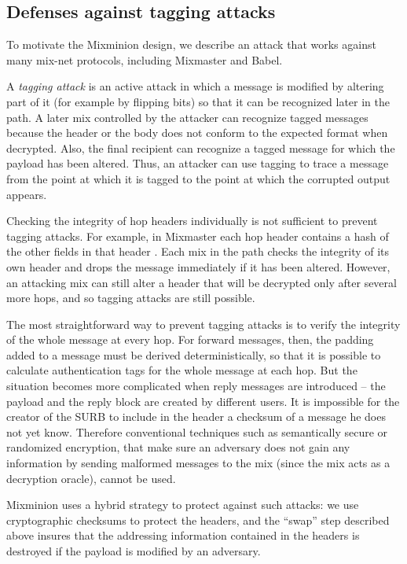 \documentclass[final]{ieee}
\begin{document}
\subsection{Defenses against tagging attacks}
\label{subsec:tagging-attacks}
\label{subsec:tagging-defenses}

To motivate the Mixminion design, we describe an attack
that works against many mix-net protocols, including Mixmaster and Babel.

A {\em tagging attack} is an active attack in which a message is
modified by altering part of it (for example by flipping bits) so
that it can be recognized later in the path.  A later mix controlled by
the attacker can recognize tagged messages because the header or the
body does
not conform to the expected format when decrypted.  Also, the final
recipient can recognize a tagged message for which the payload has
been altered.  Thus, an attacker can use tagging to trace a message from the
point at which it is tagged to the point at which the corrupted output
appears. 

Checking the integrity of hop headers individually is not
sufficient to prevent tagging attacks.  For example, in Mixmaster
each hop header contains a hash of the other fields in that header
\cite{mixmaster-spec}.
Each mix in the path checks the integrity of its own header and drops
the message immediately if it has been altered.  However, 
an attacking mix can still alter a header that will be decrypted
only after several more hops, and so tagging attacks are still possible.

The most straightforward way to prevent tagging attacks is to
verify the integrity of the whole message at every hop.  For forward messages,
then, the padding added to a message must be derived deterministically,
so that it is possible to calculate
authentication tags for the whole message at each hop.  But
the situation becomes more complicated when reply messages are
introduced -- the payload and the reply block are
created by different users. It is impossible for the creator
of the SURB to include in the header a checksum of a message he
does not yet know. Therefore conventional techniques 
such as semantically secure or randomized encryption, that
make sure an adversary does not gain any information by sending
malformed messages to the mix (since the mix acts as a decryption oracle),
cannot be used.

Mixminion uses a hybrid strategy to protect against such attacks: we use
cryptographic checksums to protect the headers, and the ``swap'' step
described above insures that the addressing information contained in the
headers is destroyed if the payload is modified by an adversary.
\end{document}
